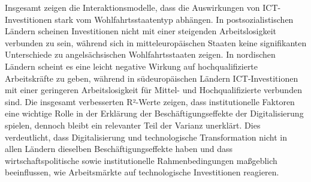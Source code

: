 Insgesamt zeigen die Interaktionsmodelle, dass die Auswirkungen von \ac{ICT}-Investitionen stark 
vom Wohlfahrtsstaatentyp abhängen. In postsozialistischen Ländern scheinen Investitionen nicht 
mit einer steigenden Arbeitslosigkeit verbunden zu sein, während sich in mitteleuropäischen 
Staaten keine signifikanten Unterschiede zu angelsächsischen Wohlfahrtsstaaten zeigen. In 
nordischen Ländern scheint es eine leicht negative Wirkung auf hochqualifizierte Arbeitskräfte zu 
geben, während in südeuropäischen Ländern \ac{ICT}-Investitionen mit einer geringeren 
Arbeitslosigkeit für Mittel- und Hochqualifizierte verbunden sind. Die insgesamt verbesserten 
R²-Werte zeigen, dass institutionelle Faktoren eine wichtige Rolle in der Erklärung der 
Beschäftigungseffekte der Digitalisierung spielen, dennoch bleibt ein relevanter Teil der Varianz 
unerklärt. Dies verdeutlicht, dass Digitalisierung und technologische Transformation nicht in 
allen Ländern dieselben Beschäftigungseffekte haben und dass wirtschaftspolitische sowie 
institutionelle Rahmenbedingungen maßgeblich beeinflussen, wie Arbeitsmärkte auf technologische 
Investitionen reagieren.
